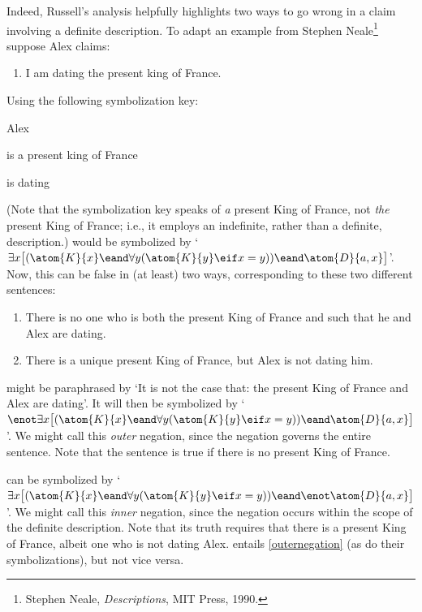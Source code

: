 Indeed, Russell's analysis helpfully highlights two ways to go wrong
in a claim involving a definite description. To adapt an example from
Stephen Neale\footnote{Stephen Neale, \textit{Descriptions},
MIT Press, 1990.} suppose Alex claims:
	\begin{enumerate}
		\item\label{kingdate} I am dating the present king of France.
	\end{enumerate}
Using the following symbolization key:
	\begin{ekey}
		\item[a] Alex
		\item[\atom{K}{x}]  is a present king of France
		\item[\atom{D}{x,y}]  is dating 
	\end{ekey}
	(Note that the symbolization key speaks of \emph{a} present King of France, not \emph{the} present King of France; i.e., it employs an indefinite, rather than a definite, description.)  would be symbolized by `$\exists x \bigl[(\atom{K}{x} \eand \forall y(\atom{K}{y} \eif  x = y)) \eand \atom{D}{a,x}\bigr]$'. Now, this can be false in (at least) two ways, corresponding to these two different sentences:
	\begin{enumerate}
		\item\label{outernegation} There is no one who is both the present King of France and such that he and Alex are dating.
		\item\label{innernegation} There is a unique present King of France, but Alex is not dating him.
	\end{enumerate}
 might be paraphrased by `It is not the case that: the present King of France and Alex are dating'. It will then be symbolized by `$\enot \exists x\bigl[(\atom{K}{x} \eand \forall y(\atom{K}{y} \eif  x = y)) \eand \atom{D}{a,x} \bigr]$'. We might call this \emph{outer} negation, since the negation governs the entire sentence. Note that the sentence is true if there is no present King of France.

 can be symbolized by `$\exists x \bigl[(\atom{K}{x} \eand \forall y(\atom{K}{y} \eif x = y)) \eand \enot \atom{D}{a,x}\bigr]$'. We might call this \emph{inner} negation, since the negation occurs within the scope of the definite description. Note that its truth requires that there is a present King of France, albeit one who is not dating Alex.
 entails \cref*{outernegation} (as do their
symbolizations), but not vice versa.

